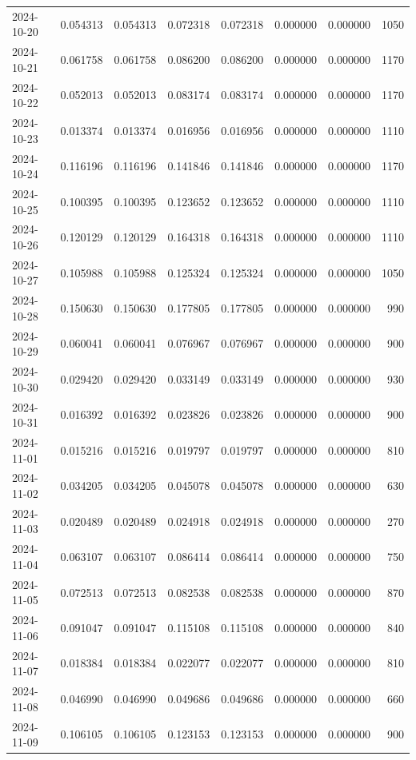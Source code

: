 \begin{tabular}{lrrrrrrr}
2024-10-20 & 0.054313 & 0.054313 & 0.072318 & 0.072318 & 0.000000 & 0.000000 & 1050 \\
2024-10-21 & 0.061758 & 0.061758 & 0.086200 & 0.086200 & 0.000000 & 0.000000 & 1170 \\
2024-10-22 & 0.052013 & 0.052013 & 0.083174 & 0.083174 & 0.000000 & 0.000000 & 1170 \\
2024-10-23 & 0.013374 & 0.013374 & 0.016956 & 0.016956 & 0.000000 & 0.000000 & 1110 \\
2024-10-24 & 0.116196 & 0.116196 & 0.141846 & 0.141846 & 0.000000 & 0.000000 & 1170 \\
2024-10-25 & 0.100395 & 0.100395 & 0.123652 & 0.123652 & 0.000000 & 0.000000 & 1110 \\
2024-10-26 & 0.120129 & 0.120129 & 0.164318 & 0.164318 & 0.000000 & 0.000000 & 1110 \\
2024-10-27 & 0.105988 & 0.105988 & 0.125324 & 0.125324 & 0.000000 & 0.000000 & 1050 \\
2024-10-28 & 0.150630 & 0.150630 & 0.177805 & 0.177805 & 0.000000 & 0.000000 & 990 \\
2024-10-29 & 0.060041 & 0.060041 & 0.076967 & 0.076967 & 0.000000 & 0.000000 & 900 \\
2024-10-30 & 0.029420 & 0.029420 & 0.033149 & 0.033149 & 0.000000 & 0.000000 & 930 \\
2024-10-31 & 0.016392 & 0.016392 & 0.023826 & 0.023826 & 0.000000 & 0.000000 & 900 \\
2024-11-01 & 0.015216 & 0.015216 & 0.019797 & 0.019797 & 0.000000 & 0.000000 & 810 \\
2024-11-02 & 0.034205 & 0.034205 & 0.045078 & 0.045078 & 0.000000 & 0.000000 & 630 \\
2024-11-03 & 0.020489 & 0.020489 & 0.024918 & 0.024918 & 0.000000 & 0.000000 & 270 \\
2024-11-04 & 0.063107 & 0.063107 & 0.086414 & 0.086414 & 0.000000 & 0.000000 & 750 \\
2024-11-05 & 0.072513 & 0.072513 & 0.082538 & 0.082538 & 0.000000 & 0.000000 & 870 \\
2024-11-06 & 0.091047 & 0.091047 & 0.115108 & 0.115108 & 0.000000 & 0.000000 & 840 \\
2024-11-07 & 0.018384 & 0.018384 & 0.022077 & 0.022077 & 0.000000 & 0.000000 & 810 \\
2024-11-08 & 0.046990 & 0.046990 & 0.049686 & 0.049686 & 0.000000 & 0.000000 & 660 \\
2024-11-09 & 0.106105 & 0.106105 & 0.123153 & 0.123153 & 0.000000 & 0.000000 & 900 \\

\end{tabular}
